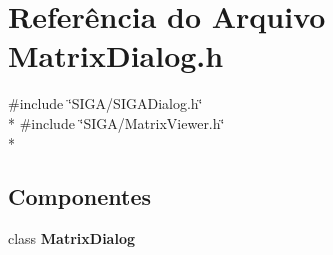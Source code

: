 \section{Referência do Arquivo Matrix\+Dialog.\+h}
\label{_matrix_dialog_8h}
{\ttfamily \#include \char`\"{}S\+I\+G\+A/\+S\+I\+G\+A\+Dialog.\+h\char`\"{}}\\*
{\ttfamily \#include \char`\"{}S\+I\+G\+A/\+Matrix\+Viewer.\+h\char`\"{}}\\*
\subsection*{Componentes}
\begin{DoxyCompactItemize}
\item 
class {\bf Matrix\+Dialog}
\end{DoxyCompactItemize}
